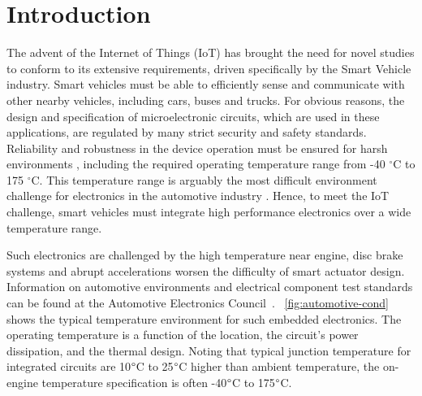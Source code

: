 
\chapter{Introduction}  %

\ifpdf
    \graphicspath{{Chapter1/Figs/Raster/}{Chapter1/Figs/PDF/}{Chapter1/Figs/}}
\else
    \graphicspath{{Chapter1/Figs/Vector/}{Chapter1/Figs/}}
\fi

The advent of the Internet of Things (IoT) has brought the need for novel studies to conform to its extensive requirements, driven specifically by the Smart Vehicle industry.   Smart vehicles must be able to efficiently sense and communicate with other nearby vehicles, including cars, buses and trucks. For obvious reasons, the design and specification of microelectronic circuits, which are used in these applications, are regulated by many strict security and safety standards. Reliability and robustness in the device operation must be ensured for harsh environments \cite{Ferreira2014}, including the required operating temperature range from -40 $^{\circ}$C to 175 $^{\circ}$C. This temperature range is arguably the most difficult environment challenge for electronics in the automotive industry \cite{Chain1997}. Hence, to meet the IoT challenge, smart vehicles must integrate high performance electronics over a wide temperature range.

Such electronics are challenged by the high temperature near engine, disc brake systems and abrupt accelerations worsen the difficulty of smart actuator design. Information on automotive environments and electrical component test standards can be found at the Automotive Electronics Council~\cite{1393072,ISO16750}. \figurename~\ref{fig:automotive-cond} shows the typical temperature environment for such embedded electronics. The operating temperature is a function of the location, the circuit's power dissipation, and the thermal design. Noting that typical junction temperature for integrated circuits are 10\(\degree \)C to 25\(\degree \)C higher than ambient temperature, the on-engine temperature specification is often -40\(\degree \)C to 175\(\degree \)C.

